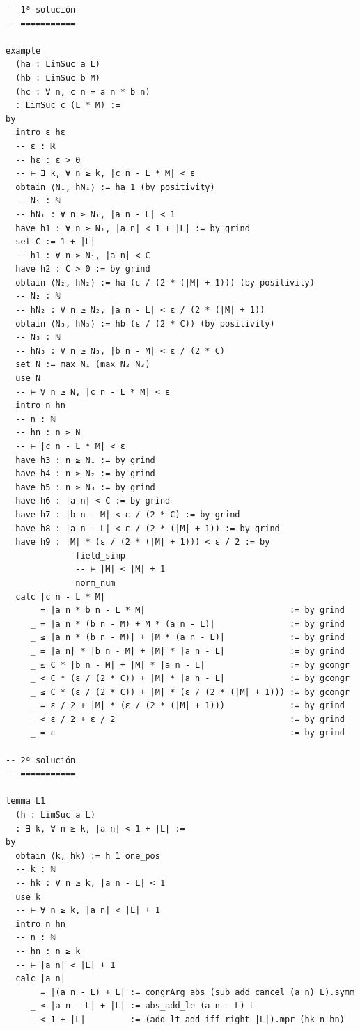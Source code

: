\begin{verbatim}
-- 1ª solución
-- ===========

example
  (ha : LimSuc a L)
  (hb : LimSuc b M)
  (hc : ∀ n, c n = a n * b n)
  : LimSuc c (L * M) :=
by
  intro ε hε
  -- ε : ℝ
  -- hε : ε > 0
  -- ⊢ ∃ k, ∀ n ≥ k, |c n - L * M| < ε
  obtain ⟨N₁, hN₁⟩ := ha 1 (by positivity)
  -- N₁ : ℕ
  -- hN₁ : ∀ n ≥ N₁, |a n - L| < 1
  have h1 : ∀ n ≥ N₁, |a n| < 1 + |L| := by grind
  set C := 1 + |L|
  -- h1 : ∀ n ≥ N₁, |a n| < C
  have h2 : C > 0 := by grind
  obtain ⟨N₂, hN₂⟩ := ha (ε / (2 * (|M| + 1))) (by positivity)
  -- N₂ : ℕ
  -- hN₂ : ∀ n ≥ N₂, |a n - L| < ε / (2 * (|M| + 1))
  obtain ⟨N₃, hN₃⟩ := hb (ε / (2 * C)) (by positivity)
  -- N₃ : ℕ
  -- hN₃ : ∀ n ≥ N₃, |b n - M| < ε / (2 * C)
  set N := max N₁ (max N₂ N₃)
  use N
  -- ⊢ ∀ n ≥ N, |c n - L * M| < ε
  intro n hn
  -- n : ℕ
  -- hn : n ≥ N
  -- ⊢ |c n - L * M| < ε
  have h3 : n ≥ N₁ := by grind
  have h4 : n ≥ N₂ := by grind
  have h5 : n ≥ N₃ := by grind
  have h6 : |a n| < C := by grind
  have h7 : |b n - M| < ε / (2 * C) := by grind
  have h8 : |a n - L| < ε / (2 * (|M| + 1)) := by grind
  have h9 : |M| * (ε / (2 * (|M| + 1))) < ε / 2 := by
              field_simp
              -- ⊢ |M| < |M| + 1
              norm_num
  calc |c n - L * M|
       = |a n * b n - L * M|                             := by grind
     _ = |a n * (b n - M) + M * (a n - L)|               := by grind
     _ ≤ |a n * (b n - M)| + |M * (a n - L)|             := by grind
     _ = |a n| * |b n - M| + |M| * |a n - L|             := by grind
     _ ≤ C * |b n - M| + |M| * |a n - L|                 := by gcongr
     _ < C * (ε / (2 * C)) + |M| * |a n - L|             := by gcongr
     _ ≤ C * (ε / (2 * C)) + |M| * (ε / (2 * (|M| + 1))) := by gcongr
     _ = ε / 2 + |M| * (ε / (2 * (|M| + 1)))             := by grind
     _ < ε / 2 + ε / 2                                   := by grind
     _ = ε                                               := by grind

-- 2ª solución
-- ===========

lemma L1
  (h : LimSuc a L)
  : ∃ k, ∀ n ≥ k, |a n| < 1 + |L| :=
by
  obtain ⟨k, hk⟩ := h 1 one_pos
  -- k : ℕ
  -- hk : ∀ n ≥ k, |a n - L| < 1
  use k
  -- ⊢ ∀ n ≥ k, |a n| < |L| + 1
  intro n hn
  -- n : ℕ
  -- hn : n ≥ k
  -- ⊢ |a n| < |L| + 1
  calc |a n|
       = |(a n - L) + L| := congrArg abs (sub_add_cancel (a n) L).symm
     _ ≤ |a n - L| + |L| := abs_add_le (a n - L) L
     _ < 1 + |L|         := (add_lt_add_iff_right |L|).mpr (hk n hn)


\end{verbatim}
